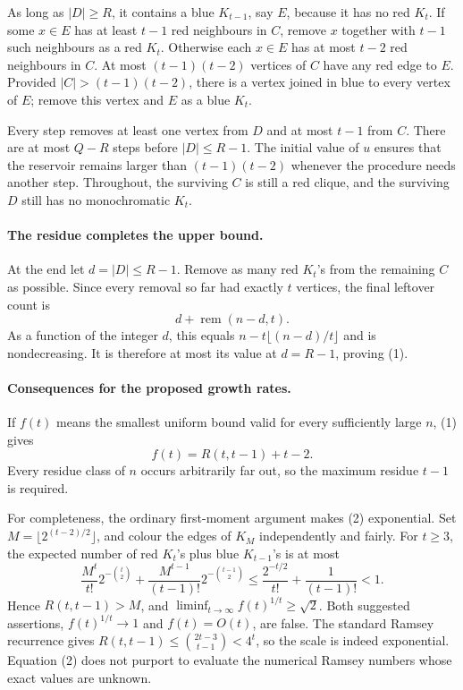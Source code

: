 As long as \(|D|\geq R\), it contains a blue \(K_{t-1}\), say \(E\), because it has no red \(K_t\). If some \(x\in E\) has at least \(t-1\) red neighbours in \(C\), remove \(x\) together with \(t-1\) such neighbours as a red \(K_t\). Otherwise each \(x\in E\) has at most \(t-2\) red neighbours in \(C\). At most \((t-1)(t-2)\) vertices of \(C\) have any red edge to \(E\). Provided \(|C|>(t-1)(t-2)\), there is a vertex joined in blue to every vertex of \(E\); remove this vertex and \(E\) as a blue \(K_t\).

Every step removes at least one vertex from \(D\) and at most \(t-1\) from \(C\). There are at most \(Q-R\) steps before \(|D|\leq R-1\). The initial value of \(u\) ensures that the reservoir remains larger than \((t-1)(t-2)\) whenever the procedure needs another step. Throughout, the surviving \(C\) is still a red clique, and the surviving \(D\) still has no monochromatic \(K_t\).

\paragraph{The residue completes the upper bound.}
At the end let \(d=|D|\leq R-1\). Remove as many red \(K_t\)'s from the remaining \(C\) as possible. Since every removal so far had exactly \(t\) vertices, the final leftover count is
\[
 d+\operatorname{rem}(n-d,t).
\]
As a function of the integer \(d\), this equals
\(n-t\lfloor(n-d)/t\rfloor\) and is nondecreasing. It is therefore at most its value at \(d=R-1\), proving (1).

\paragraph{Consequences for the proposed growth rates.}
If \(f(t)\) means the smallest uniform bound valid for every sufficiently large \(n\), (1) gives
\[
 f(t)=R(t,t-1)+t-2.
\tag{2}
\]
Every residue class of \(n\) occurs arbitrarily far out, so the maximum residue \(t-1\) is required.

For completeness, the ordinary first-moment argument makes (2) exponential. Set \(M=\lfloor2^{(t-2)/2}\rfloor\), and colour the edges of \(K_M\) independently and fairly. For \(t\geq3\), the expected number of red \(K_t\)'s plus blue \(K_{t-1}\)'s is at most
\[
 \frac{M^t}{t!}2^{-\binom t2}
 +\frac{M^{t-1}}{(t-1)!}2^{-\binom{t-1}2}
 \leq\frac{2^{-t/2}}{t!}+\frac1{(t-1)!}<1.
\]
Hence \(R(t,t-1)>M\), and
\(\liminf_{t\to\infty}f(t)^{1/t}\geq\sqrt2\). Both suggested assertions, \(f(t)^{1/t}\to1\) and \(f(t)=O(t)\), are false. The standard Ramsey recurrence gives
\(R(t,t-1)\leq\binom{2t-3}{t-1}<4^t\), so the scale is indeed exponential. Equation (2) does not purport to evaluate the numerical Ramsey numbers whose exact values are unknown.

